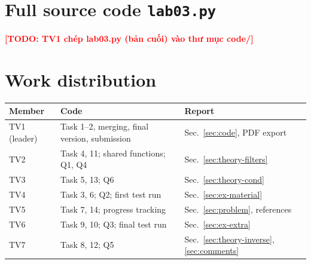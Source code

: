 \documentclass[11pt,a4paper]{article}
\newcommand{\todo}[1]{\textcolor{red}{\textbf{[TODO: #1]}}}
\begin{document}
\clearpage
\appendix
\section{Full source code \texttt{lab03.py}}\label{app:code}
  {}
  {\todo{TV1 chép lab03.py (bản cuối) vào thư mục code/}}

\section{Work distribution}
\begin{tabular}{>{\raggedright}p{3.2cm}p{5.6cm}p{5.6cm}}
\toprule
Member & Code & Report \\
\midrule
TV1 (leader) & Task 1--2, merging, final version, submission & Sec.~\ref{sec:code}, PDF export \\
TV2 & Task 4, 11; shared functions; Q1, Q4 & Sec.~\ref{sec:theory-filters} \\
TV3 & Task 5, 13; Q6 & Sec.~\ref{sec:theory-cond} \\
TV4 & Task 3, 6; Q2; first test run & Sec.~\ref{sec:ex-material} \\
TV5 & Task 7, 14; progress tracking & Sec.~\ref{sec:problem}, references \\
TV6 & Task 9, 10; Q3; final test run & Sec.~\ref{sec:ex-extra} \\
TV7 & Task 8, 12; Q5 & Sec.~\ref{sec:theory-inverse}, \ref{sec:comments} \\
\bottomrule
\end{tabular}

\clearpage
\nocite{zemlyanova2020,strang2016}  %


\end{document}
